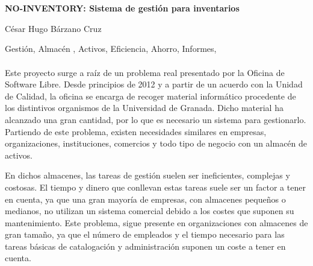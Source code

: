 \chapter*{}






\cleardoublepage
\thispagestyle{empty}

\begin{center}
{\large\bfseries NO-INVENTORY: Sistema de gestión para inventarios}\\
\end{center}
\begin{center}
César Hugo Bárzano Cruz\\
\end{center}

Gestión, Almacén , Activos, Eficiencia, Ahorro, Informes, 
\\

\vspace{0.7cm}
\\

Este proyecto surge a raíz de un problema real presentado por la Oficina de Software Libre. Desde principios de 2012 y a partir de un acuerdo con la Unidad de Calidad, la oficina se encarga de recoger material informático procedente de los distintivos organismos de la Universidad de Granada. Dicho material ha alcanzado una gran cantidad, por lo que es necesario un sistema para gestionarlo. 
Partiendo de este problema, existen necesidades similares en empresas, organizaciones, instituciones, comercios y todo tipo de negocio con un almacén de activos.

En dichos almacenes, las tareas de gestión suelen ser ineficientes, complejas y costosas.  El tiempo y dinero que conllevan estas tareas suele ser un factor a tener en cuenta, ya que una gran mayoría de empresas, con almacenes pequeños o medianos, no utilizan un sistema comercial debido a los costes que suponen su mantenimiento. Este problema, sigue presente en organizaciones con almacenes de gran tamaño, ya que  el número de empleados y el tiempo necesario para las tareas básicas de catalogación y administración suponen un coste a tener en cuenta.

